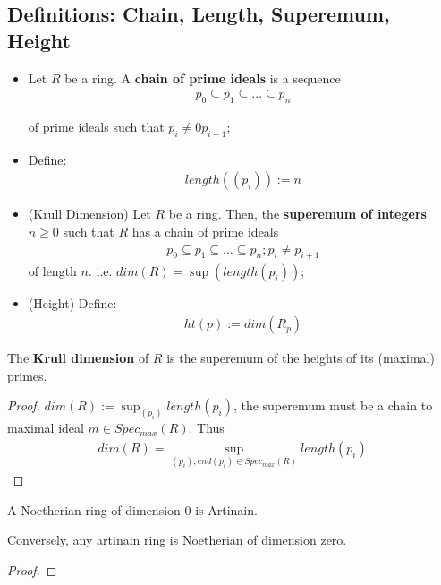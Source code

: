\documentclass[Total.tex]{subfiles}
\begin{document}
			\subsection{Definitions: Chain, Length, Superemum, Height}
			\begin{Def}
				\begin{itemize}
					\item Let $R$ be a ring. A \textbf{chain of prime ideals} is a sequence
					\begin{gather*}
						p_0\subseteq p_1\subseteq \dots\subseteq p_n
					\end{gather*}
					
					of prime ideals such that $p_i\not=0 p_{i+1}$;
					\item Define:
					\begin{gather*}
						length((p_i)):=n
					\end{gather*}
					\item (Krull Dimension) Let $R$ be a ring. Then, the \textbf{superemum of integers} $n\geq 0$ such that $R$ has a chain of prime ideals
					\begin{gather*}
						p_0\subseteq p_1\subseteq \dots\subseteq p_n;p_i\not=p_{i+1}
					\end{gather*}
					of length $n$. i.e. $dim(R)=\sup(length(p_i))$;
					\item (Height) Define:
					\begin{gather*}
						ht(p):=dim(R_p)
					\end{gather*}
				\end{itemize}
			\end{Def}
			\begin{lemma}
				The \textbf{Krull dimension} of $R$ is the superemum of the heights of its (maximal) primes.
			\end{lemma}
			\begin{proof}
				$dim(R):=\sup_{(p_i)}{length(p_i)}$, the superemum must be a chain to maximal ideal $m\in Spec_{max}(R)$. Thus
				\begin{gather*}
					dim(R)=\sup_{(p_i),end(p_i)\in Spec_{max}(R)} length(p_i)
				\end{gather*}
			\end{proof}
			\begin{lemma}
				A Noetherian ring of dimension $0$ is Artinain. 
				
				Conversely, any artinain ring is Noetherian of dimension zero.
			\end{lemma}
			\begin{proof}
				
			\end{proof}
			
\end{document}
